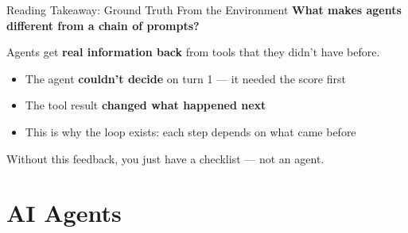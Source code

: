 \documentclass[aspectratio=169]{beamer}
\begin{document}
\begin{frame}{Reading Takeaway: Ground Truth From the Environment}
\textbf{What makes agents different from a chain of prompts?}
\vspace{0.3cm}

Agents get \textbf{real information back} from tools that they didn't have before.
\vspace{0.3cm}

\begin{center}
\end{center}
\vspace{0.3cm}

\begin{itemize}
    \item The agent \textbf{couldn't decide} on turn 1 --- it needed the score first
    \item The tool result \textbf{changed what happened next}
    \item This is why the loop exists: each step depends on what came before
\end{itemize}
\vspace{0.2cm}

Without this feedback, you just have a checklist --- not an agent.
\end{frame}

\section{AI Agents}
\end{document}
